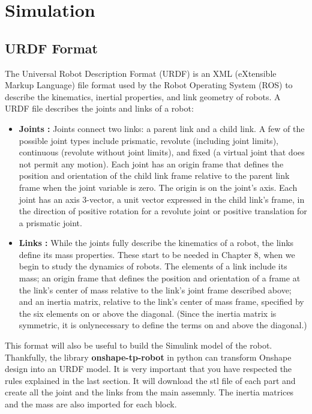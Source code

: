 \section{Simulation}\insertloftspace
\setcounter{figure}{0}\setcounter{table}{0}

\subsection{URDF Format}

\hspace{\parindent} The Universal Robot Description Format (URDF) is an XML (eXtensible Markup Language) file format used by the Robot Operating System (ROS) to describe the kinematics, inertial properties, and link geometry of robots. A URDF file describes the joints and links of a robot:

\begin{itemize}
    \item \textbf{Joints :} Joints connect two links: a parent link and a child link. A few of the possible joint types include prismatic, revolute (including joint limits), continuous (revolute without joint limits), and fixed (a virtual joint that does not permit any motion). Each joint has an origin frame that defines the position and orientation of the child link frame relative to the parent link frame when the joint variable is zero. The origin is on the joint's axis. Each joint has an axis 3-vector, a unit vector expressed in the child link's frame, in the direction of positive rotation for a revolute joint or positive translation for a prismatic joint.
    \item \textbf{Links :} While the joints fully describe the kinematics of a robot, the links define its mass properties. These start to be needed in Chapter 8, when we begin to study the dynamics of robots. The elements of a link include its mass; an origin frame that defines the position and orientation of a frame at the link's center of mass relative to the link's joint frame described above; and an inertia matrix, relative to the link's center of mass frame, specified by the six elements on or above the diagonal. (Since the inertia matrix is symmetric, it is onlynecessary to define the terms on and above the diagonal.)
\end{itemize}

\bigbreak
This format will also be useful to build the Simulink model of the robot. Thankfully, the library \textbf{onshape-tp-robot} in python can transform Onshape design into an URDF model. It is very important that you have respected the rules explained in the last section. It will download the stl file of each part and create all the joint and the links from the main assemnly. The inertia matrices and the mass are also imported for each block. 


